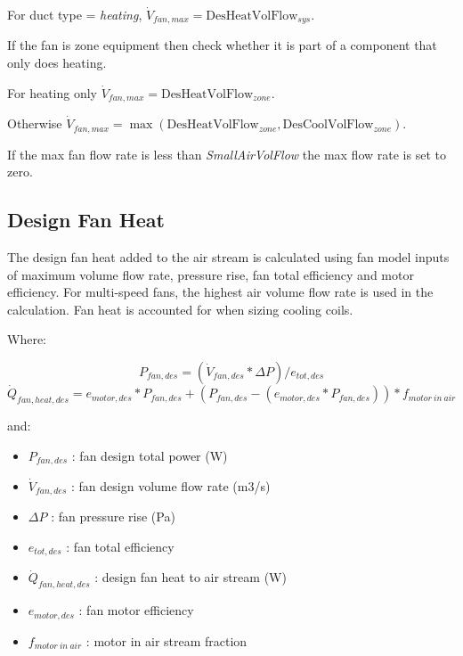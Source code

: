 For duct type = \emph{heating}, \(\dot{V}_{fan,max} = \text{DesHeatVolFlow}_{sys}\).

If the fan is zone equipment then check whether it is part of a component that only does heating.

For heating only \(\dot{V}_{fan,max} = \text{DesHeatVolFlow}_{zone}\).

Otherwise \(\dot{V}_{fan,max} = \max\left(\text{DesHeatVolFlow}_{zone},\text{DesCoolVolFlow}_{zone}\right)\).

If the max fan flow rate is less than \emph{SmallAirVolFlow} the max flow rate is set to zero.

\subsection{Design Fan Heat}\label{design-fan-heat}

The design fan heat added to the air stream is calculated using fan model inputs of maximum volume flow rate, pressure rise, fan total efficiency and motor efficiency. For multi-speed fans, the highest air volume flow rate is used in the calculation. Fan heat is accounted for when sizing cooling coils.

Where:

\begin{equation}
P_{fan,des} = ( \dot{V}_{fan,des} * \Delta P ) / e_{tot,des}
\end{equation}
\begin{equation}
\dot{Q}_{fan,heat,des} = e_{motor,des} * P_{fan,des} + (P_{fan,des} - (e_{motor,des} * P_{fan,des})) * f_{motor\ in\ air}
\end{equation}

and:

\begin{itemize}
\item
  \(P_{fan,des}\) : fan design total power (W)
\item
  \(\dot{V}_{fan,des}\) : fan design volume flow rate (m3/s)
\item
  \(\Delta P\) : fan pressure rise (Pa)
\item
  \(e_{tot,des}\) : fan total efficiency
\item
  \(\dot{Q}_{fan,heat,des}\) : design fan heat to air stream (W)
\item
  \(e_{motor,des}\) : fan motor efficiency
\item
  \(f_{motor\ in\ air}\) : motor in air stream fraction
\end{itemize} 

